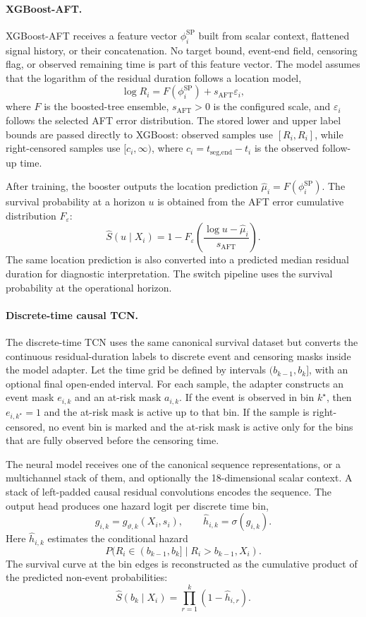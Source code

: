 \paragraph{XGBoost-AFT.}
XGBoost-AFT receives a feature vector \(\phi_i^{\text{SP}}\) built from scalar
context, flattened signal history, or their concatenation. No target bound,
event-end field, censoring flag, or observed remaining time is part of this
feature vector. The model assumes that the logarithm of the residual duration
follows a location model,
\[
  \log R_i = F(\phi_i^{\text{SP}}) + s_{\mathrm{AFT}} \varepsilon_i,
\]
where \(F\) is the boosted-tree ensemble, \(s_{\mathrm{AFT}}>0\) is the
configured scale, and \(\varepsilon_i\) follows the selected AFT error
distribution. The stored lower and upper label bounds are passed directly to
XGBoost: observed samples use \([R_i,R_i]\), while right-censored samples use
\([c_i,\infty)\), where \(c_i=t_{\text{seg,end}}-t_i\) is the observed
follow-up time.

After training, the booster outputs the location prediction
\(\widehat{\mu}_i=F(\phi_i^{\text{SP}})\). The survival probability at a horizon
\(u\) is obtained from the AFT error cumulative distribution \(F_\varepsilon\):
\[
  \widehat{S}(u\mid X_i)
  =
  1
  -
  F_\varepsilon
  \left(
    \frac{\log u-\widehat{\mu}_i}{s_{\mathrm{AFT}}}
  \right).
\]
The same location prediction is also converted into a predicted median residual
duration for diagnostic interpretation. The switch pipeline uses the survival
probability at the operational horizon.

\paragraph{Discrete-time causal TCN.}
The discrete-time TCN uses the same canonical survival dataset but converts the
continuous residual-duration labels to discrete event and censoring masks inside
the model adapter. Let the time grid be defined by intervals
\((b_{k-1},b_k]\), with an optional final open-ended interval. For each sample,
the adapter constructs an event mask \(e_{i,k}\) and an at-risk mask
\(a_{i,k}\). If the event is observed in bin \(k^\star\), then
\(e_{i,k^\star}=1\) and the at-risk mask is active up to that bin. If the sample
is right-censored, no event bin is marked and the at-risk mask is active only
for the bins that are fully observed before the censoring time.

The neural model receives one of the canonical sequence representations, or a
multichannel stack of them, and optionally the 18-dimensional scalar context. A
stack of left-padded causal residual convolutions encodes the sequence. The
output head produces one hazard logit per discrete time bin,
\[
  g_{i,k}=g_{\vartheta,k}(X_i,s_i),
  \qquad
  \widehat{h}_{i,k}=\sigma(g_{i,k}).
\]
Here \(\widehat{h}_{i,k}\) estimates the conditional hazard
\[
  P(R_i\in(b_{k-1},b_k] \mid R_i>b_{k-1}, X_i).
\]
The survival curve at the bin edges is reconstructed as the cumulative product
of the predicted non-event probabilities:
\[
  \widehat{S}(b_k\mid X_i)
  =
  \prod_{r=1}^{k}(1-\widehat{h}_{i,r}).
\]

